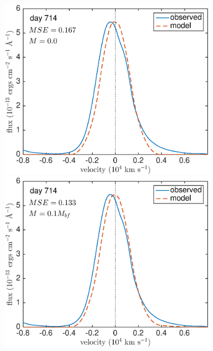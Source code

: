 \begin{figure}
\centering

\includegraphics[clip = true, scale=0.43, trim=20 20 40 0]{chapters/chapter5/images/MSE/d714_M/d714_M0}
\includegraphics[clip = true, scale=0.43, trim=52 20 40 0]{chapters/chapter5/images/MSE/d714_M/d714_M0_1}


\end{figure}
